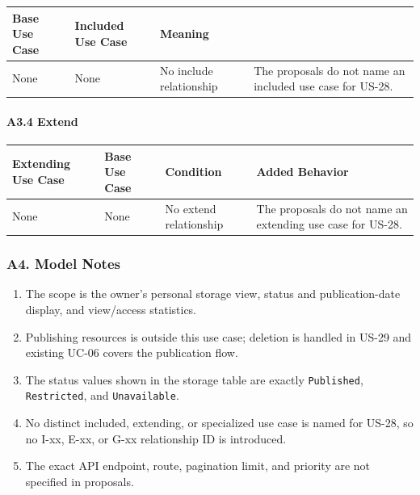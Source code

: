 \documentclass[12pt]{article}
\renewcommand{\baselinestretch}{1.5}
\begin{document}
\begingroup
\small
\renewcommand{\baselinestretch}{1.0}\selectfont
\renewcommand{\arraystretch}{1.15}
\setlength{\tabcolsep}{6pt}
\begin{longtable}{|>{\raggedright\arraybackslash}p{}|>{\raggedright\arraybackslash}p{}|>{\raggedright\arraybackslash}p{}|}
\hline
\textbf{Base Use Case} & \textbf{Included Use Case} & \textbf{Meaning} \\ \hline
\endhead
None & None & No include relationship & The proposals do not name an included use case for US-28. \\ \hline
\end{longtable}
\endgroup
\par\medskip

\hypertarget{sec:a3-4-extend}{}
\paragraph*{A3.4 Extend}
\par\medskip

\begingroup
\small
\renewcommand{\baselinestretch}{1.0}\selectfont
\renewcommand{\arraystretch}{1.15}
\setlength{\tabcolsep}{6pt}
\begin{longtable}{|>{\raggedright\arraybackslash}p{}|>{\raggedright\arraybackslash}p{}|>{\raggedright\arraybackslash}p{}|>{\raggedright\arraybackslash}p{}|}
\hline
\textbf{Extending Use Case} & \textbf{Base Use Case} & \textbf{Condition} & \textbf{Added Behavior} \\ \hline
\endhead
None & None & No extend relationship & The proposals do not name an extending use case for US-28. \\ \hline
\end{longtable}
\endgroup
\par\medskip

\hypertarget{sec:a4-model-notes}{}
\subsubsection*{A4. Model Notes}
\par\medskip

\begin{enumerate}
\item The scope is the owner's personal storage view, status and publication-date display, and view/access statistics.
\item Publishing resources is outside this use case; deletion is handled in US-29 and existing UC-06 covers the publication flow.
\item The status values shown in the storage table are exactly \texttt{Published}, \texttt{Restricted}, and \texttt{Unavailable}.
\item No distinct included, extending, or specialized use case is named for US-28, so no I-xx, E-xx, or G-xx relationship ID is introduced.
\item The exact API endpoint, route, pagination limit, and priority are not specified in proposals.
\end{enumerate}
\par\medskip
\end{document}
